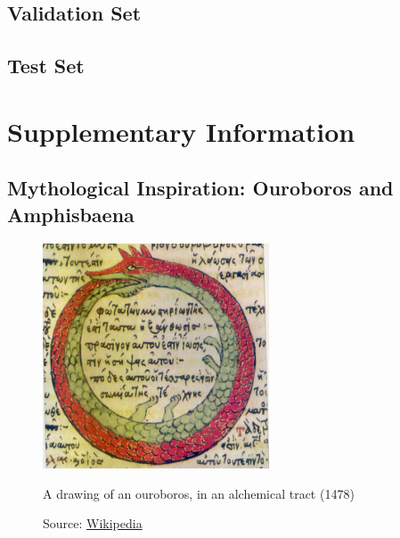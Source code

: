 \begin{uomappendix}
            \subsection{Validation Set} \label{data:val}
    
            \subsection{Test Set} \label{data:test}
    
    
        \section{Supplementary Information}
    
            \subsection{Mythological Inspiration: Ouroboros and Amphisbaena}
    
                \begin{figure}[h]
                    \centering
                    \includegraphics[width=0.6\textwidth]{images/Ouroborus.jpg}
                    \caption{A drawing of an ouroboros, in an alchemical tract (1478)}
                    \label{fig:ouroboros}
                    \caption*{Source: \href{https://en.wikipedia.org/wiki/File:Serpiente_alquimica.jpg}{Wikipedia}}
                \end{figure}
    

\end{uomappendix}
